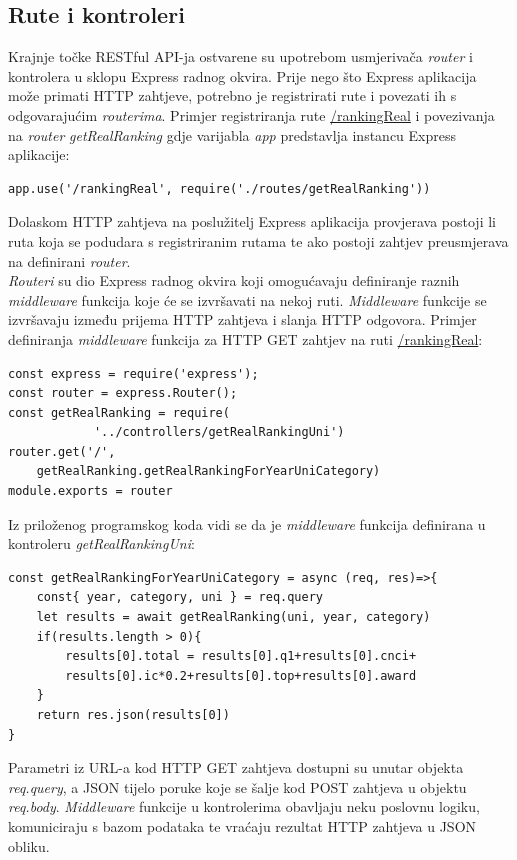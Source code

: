 \documentclass[times, utf8, zavrsni]{fer}
\begin{document}
\subsection{Rute i kontroleri}
Krajnje točke  RESTful API-ja ostvarene su upotrebom usmjerivača \emph{router} i kontrolera u sklopu Express radnog okvira. 
Prije nego što Express aplikacija može primati HTTP zahtjeve, potrebno je registrirati rute i povezati ih s odgovarajućim \emph{routerima}.
Primjer registriranja rute \url{/rankingReal} i povezivanja na \emph{router} \emph{getRealRanking} gdje varijabla \emph{app} predstavlja instancu Express aplikacije:
\begin{lstlisting}  
app.use('/rankingReal', require('./routes/getRealRanking'))
\end{lstlisting}
Dolaskom HTTP zahtjeva na poslužitelj Express aplikacija provjerava postoji li ruta koja se podudara s registriranim rutama te ako postoji 
zahtjev preusmjerava na definirani \emph{router}.
\\\emph{Routeri} su dio Express radnog okvira koji omogućavaju definiranje raznih \emph{middleware} funkcija koje će se izvršavati 
na nekoj ruti.
\emph{Middleware} funkcije se izvršavaju između prijema HTTP zahtjeva i slanja HTTP odgovora. Primjer definiranja \emph{middleware}
funkcija za HTTP GET zahtjev na ruti \url{/rankingReal}:
\begin{lstlisting}  
const express = require('express');
const router = express.Router();
const getRealRanking = require(
            '../controllers/getRealRankingUni')
router.get('/', 
    getRealRanking.getRealRankingForYearUniCategory)
module.exports = router
\end{lstlisting}
Iz priloženog programskog koda vidi se da je \emph{middleware} funkcija definirana u kontroleru \emph{getRealRankingUni}:
\begin{lstlisting}  
const getRealRankingForYearUniCategory = async (req, res)=>{
    const{ year, category, uni } = req.query
    let results = await getRealRanking(uni, year, category)
    if(results.length > 0){
        results[0].total = results[0].q1+results[0].cnci+
        results[0].ic*0.2+results[0].top+results[0].award
    }
    return res.json(results[0])
}
\end{lstlisting}
Parametri iz URL-a kod HTTP GET zahtjeva dostupni su unutar objekta \emph{req.query}, a JSON tijelo poruke koje se šalje kod POST zahtjeva u objektu \emph{req.body}.
\emph{Middleware} funkcije u kontrolerima obavljaju neku poslovnu logiku, komuniciraju s bazom podataka te vraćaju rezultat HTTP zahtjeva u JSON obliku.
\end{document}
